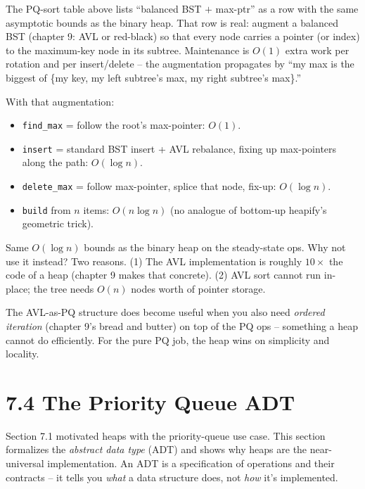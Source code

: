 \documentclass[11pt]{article}
\begin{document}
\begin{notebox}
The PQ-sort table above lists ``balanced BST $+$ max-ptr'' as a row
with the same asymptotic bounds as the binary heap. That row is real:
augment a balanced BST (chapter 9: AVL or red-black) so that every
node carries a pointer (or index) to the maximum-key node in its
subtree. Maintenance is $O(1)$ extra work per rotation and per
insert/delete -- the augmentation propagates by ``my max is the
biggest of \{my key, my left subtree's max, my right subtree's
max\}.''

With that augmentation:
\begin{itemize}[leftmargin=*]
    \item \texttt{find\_max} = follow the root's max-pointer:
          $O(1)$.
    \item \texttt{insert} = standard BST insert + AVL rebalance,
          fixing up max-pointers along the path: $O(\log n)$.
    \item \texttt{delete\_max} = follow max-pointer, splice that
          node, fix-up: $O(\log n)$.
    \item \texttt{build} from $n$ items: $O(n \log n)$ (no analogue
          of bottom-up heapify's geometric trick).
\end{itemize}

Same $O(\log n)$ bounds as the binary heap on the steady-state ops.
Why not use it instead? Two reasons. (1) The AVL implementation is
roughly $10\times$ the code of a heap (chapter 9 makes that
concrete). (2) AVL sort cannot run in-place; the tree needs $O(n)$
nodes worth of pointer storage.

The AVL-as-PQ structure does become useful when you also need
\emph{ordered iteration} (chapter 9's bread and butter) on top of the
PQ ops -- something a heap cannot do efficiently. For the pure PQ
job, the heap wins on simplicity and locality.
\end{notebox}

\section{7.4 The Priority Queue ADT}

Section 7.1 motivated heaps with the priority-queue use case. This section formalizes the \emph{abstract data type} (ADT) and shows why heaps are the near-universal implementation. An ADT is a specification of operations and their contracts -- it tells you \emph{what} a data structure does, not \emph{how} it's implemented.
\end{document}
